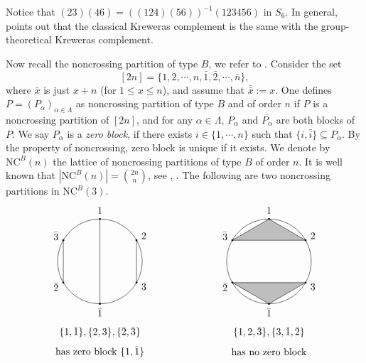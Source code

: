 \documentclass[a4paper, 11pt, reqno]{amsart}
\numberwithin{equation}{section}
\theoremstyle{remark}
\theoremstyle{definition}
\begin{document}
Notice that $(23)(46)=((124)(56))^{-1}(123456)$ in $S_6$. In general, \cite[Section 3]{kreweras1972partitions} points out that the classical Kreweras complement is the same with the group-theoretical Kreweras complement.

Now recall the noncrossing partition of type $B$, we refer to \cite{reiner1997non}. Consider the set
\[
    [2n]=\{ 1,2,\cdots,n,\bar 1,\bar 2,\cdots,\bar n \},
\]
where $\bar x$ is just $x+n$ (for $1 \leq x \leq n$), and assume that $\bar{\bar x}:=x$. One defines $P=(P_\alpha)_{\alpha \in \Lambda}$ as noncrossing partition of type $B$ and of order $n$ if $P$ is a noncrossing partition of $[2n]$, and for any $\alpha \in \Lambda$, $P_\alpha$ and $\overline{ P_{\alpha}}$ are both blocks of $P$. We say $P_{\alpha}$ is a \emph{zero block}, if there exists $i\in \{1, \cdots, n \}$ such that $\{i,\bar i \}\subseteq P_{\alpha}$. By the property of noncrossing, zero block is unique if it exists. We denote by $\mathrm{NC}^B(n)$ the lattice of noncrossing partitions of type $B$ of order $n$. It is well known that $|\mathrm{NC}^B(n)|=\binom{2n}{n}$, see \cite[Proposition 6]{reiner1997non}, \cite[Section 1.4]{biane2003non}. The following are two noncrossing partitions in $\mathrm{NC}^B(3)$. 
\[
\begin{tikzpicture}
\begin{scope}[xshift=-3cm]
\draw (0,0) circle (1.5);
\node (a) at (90:1.8) {1};
\node (b) at (30:1.8) {2};
\node (c) at (-30:1.8) {3};
\node (d) at (-90:1.8) {$\bar 1$};
\node (e) at (-150:1.8) {$\bar 2$};
\node (f) at (150:1.8) {$\bar 3$};
\node (g) at (-90:2.5) {$\{1,\bar 1\},\{2, 3\},\{\bar 2, \bar 3\}$};
\node (h) at (-90:3.2) {has zero block $\{1, \bar 1 \}$};
\fill (90:1.5) circle (1pt);
\fill (30:1.5) circle (1pt);
\fill (-30:1.5) circle (1pt);
\fill (-90:1.5) circle (1pt);
\fill (-150:1.5) circle (1pt);
\fill (150:1.5) circle (1pt);
\draw (90:1.5) to (-90:1.5);
\draw (30:1.5) to (-30:1.5);
\draw (150:1.5) to (-150:1.5);
\end{scope}
\begin{scope}[xshift=3cm]
\draw (0,0) circle (1.5);
\node (a) at (90:1.8) {1};
\node (b) at (30:1.8) {2};
\node (c) at (-30:1.8) {3};
\node (d) at (-90:1.8) {$\bar 1$};
\node (e) at (-150:1.8) {$\bar 2$};
\node (f) at (150:1.8) {$\bar 3$};
\node (g) at (-90:2.5) {$\{1,2,\bar 3\},\{3,\bar 1, \bar 2\}$};
\node (h) at (-90:3.2) {has no zero block};
\fill (90:1.5) circle (1pt);
\fill (30:1.5) circle (1pt);
\fill (-30:1.5) circle (1pt);
\fill (-90:1.5) circle (1pt);
\fill (-150:1.5) circle (1pt);
\fill (150:1.5) circle (1pt);
\filldraw[fill=gray, fill opacity=0.5] (150:1.5) to (90:1.5) to (30:1.5) to (150:1.5);
\filldraw[fill=gray, fill opacity=0.5] (-150:1.5) to (-90:1.5) to (-30:1.5) to (-150:1.5);
\end{scope}
\end{tikzpicture}
\]
\end{document}
